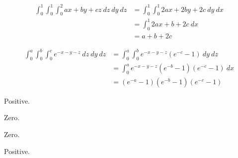 \documentclass[10pt]{extarticle}
\begin{document}
  \begin{problem}{16.3}
    \begin{description}[font=\normalfont]
      \item[2:]
        \begin{align*}
          \int_{0}^{1}\int_{0}^{1}\int_{0}^{2} ax+by+cz~dz~dy~dz &= \int_{0}^{1}\int_{0}^{1} 2ax+2by+2c~dy~dx\\
                                                                 &= \int_{0}^{1}2ax + b + 2c~dx\\
                                                                 &= a + b + 2c
        \end{align*}
      \item[4:]
        \begin{align*}
          \int_{0}^{a}\int_{0}^{b}\int_{0}^{c}e^{-x-y-z}~dz~dy~dz &= \int_{0}^{a}\int_{0}^{b}e^{-x-y-z}\left(e^{-c}-1\right)~dy~dz\\
                                                                  &= \int_{0}^{a}e^{-x-y-z}\left(e^{-b}-1\right)\left(e^{-c}-1\right)~dx\\
                                                                  &= \left(e^{-a}-1\right)\left(e^{-b} - 1\right) \left(e^{-c} - 1\right)
        \end{align*}
      \item[6:]
      \item[16:] Positive.
      \item[18:] Zero.
      \item[24:] Zero.
      \item[26:] Positive.
    \end{description}
  \end{problem}
\end{document}
